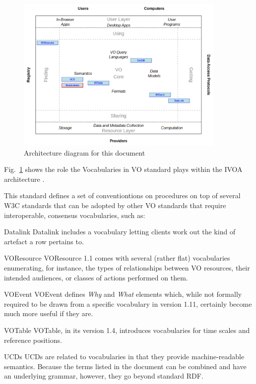 \documentclass[11pt,a4paper]{ivoa}
\begin{document}
\begin{figure}
\centering

\includegraphics[width=0.9\textwidth]{role_diagram.pdf}
\caption{Architecture diagram for this document}
\label{fig:archdiag}
\end{figure}

Fig.~\ref{fig:archdiag} shows the role the Vocabularies in VO standard
plays within the IVOA architecture \citep{2010ivoa.rept.1123A}.

This standard defines a set of conventiontions on procedures on
top of several W3C standards that can be adopted by other VO standards
that require interoperable, consensus vocabularies, such as:

\begin{bigdescription}
\item[Datalink \citep{2015ivoa.spec.0617D}] Datalink includes a
vocabulary letting clients work out the kind of artefact a row pertains
to.

\item[VOResource \citep{2018ivoa.spec.0625P}] VOResource 1.1 comes with
several (rather flat) vocabularies enumerating, for instance, the types
of relationships between VO resources, their intended audiences, or
classes of actions performed on them.

\item[VOEvent \citep{2006ivoa.spec.1101S}] VOEvent defines \emph{Why}
and \emph{What} elements which, while not formally required to be drawn
from a specific vocabulary in version 1.11, certainly become much more
useful if they are.

\item[VOTable \citep{2019ivoa.spec.1021O}] VOTable, in its version 1.4,
introduces vocabularies for time scales and reference positions.


\item[UCDs \citep{2007ivoa.spec.0402M}] UCDs are related to vocabularies in
that they provide machine-readable semantics.  Because the terms listed
in the document can be combined and have an underlying grammar, however,
they go beyond standard RDF.
\end{bigdescription}
\end{document}
